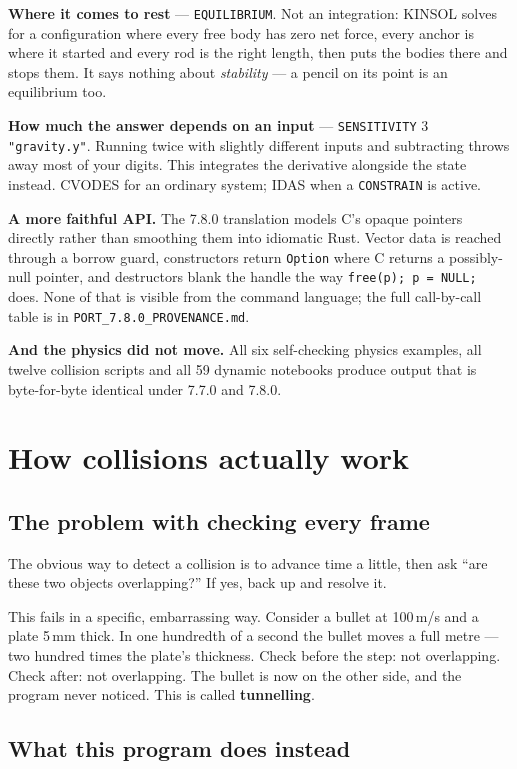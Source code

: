 \documentclass[11pt]{article}
\newcommand{\kw}[1]{\texttt{\uppercase{#1}}}
\newcommand{\code}[1]{\texttt{#1}}
\begin{document}
\textbf{Where it comes to rest} --- \kw{equilibrium}. Not an
integration: KINSOL solves for a configuration where every free body has
zero net force, every anchor is where it started and every rod is the
right length, then puts the bodies there and stops them. It says nothing
about \emph{stability} --- a pencil on its point is an equilibrium too.

\textbf{How much the answer depends on an input} ---
\kw{sensitivity} 3 \code{"gravity.y"}. Running twice with slightly
different inputs and subtracting throws away most of your digits. This
integrates the derivative alongside the state instead. CVODES for an
ordinary system; IDAS when a \kw{constrain} is active.

\textbf{A more faithful API.} The 7.8.0 translation models C's opaque
pointers directly rather than smoothing them into idiomatic Rust. Vector
data is reached through a borrow guard, constructors return
\code{Option} where C returns a possibly-null pointer, and destructors
blank the handle the way \code{free(p); p = NULL;} does. None of that is
visible from the command language; the full call-by-call table is in
\code{PORT\_7.8.0\_PROVENANCE.md}.

\textbf{And the physics did not move.} All six self-checking physics
examples, all twelve collision scripts and all 59 dynamic notebooks
produce output that is byte-for-byte identical under 7.7.0 and 7.8.0.

\section{How collisions actually work}

\subsection{The problem with checking every frame}

The obvious way to detect a collision is to advance time a little, then
ask ``are these two objects overlapping?'' If yes, back up and resolve
it.

This fails in a specific, embarrassing way. Consider a bullet at
100\,m/s and a plate 5\,mm thick. In one hundredth of a second the
bullet moves a full metre --- two hundred times the plate's thickness.
Check before the step: not overlapping. Check after: not overlapping.
The bullet is now on the other side, and the program never noticed. This
is called \textbf{tunnelling}.

\subsection{What this program does instead}
\end{document}
